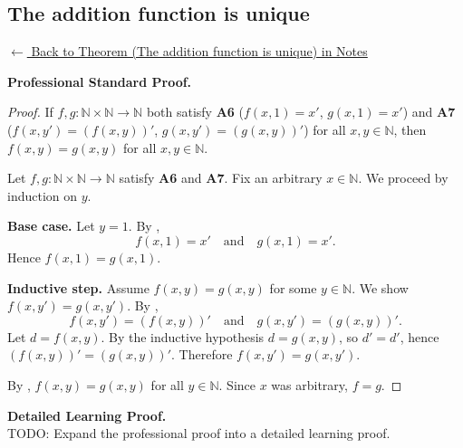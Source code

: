 
\subsection*{The addition function is unique}
\label{prf:landau-addition-unique}

\begin{remark*}[Return]
\hyperref[thm:landau-addition-unique]{$\leftarrow$ Back to Theorem
(The addition function is unique) in Notes}
\end{remark*}

\textbf{Professional Standard Proof.}~\\
\begin{proof}
\Claim If $f, g : \mathbb{N} \times \mathbb{N} \to \mathbb{N}$ both satisfy
\textbf{A6} ($f(x,1) = x'$, $g(x,1) = x'$) and \textbf{A7}
($f(x,y') = (f(x,y))'$, $g(x,y') = (g(x,y))'$) for all $x, y \in \mathbb{N}$,
then $f(x,y) = g(x,y)$ for all $x, y \in \mathbb{N}$.

Let $f, g : \mathbb{N} \times \mathbb{N} \to \mathbb{N}$ satisfy \textbf{A6}
and \textbf{A7}. Fix an arbitrary $x \in \mathbb{N}$. We proceed by induction
on $y$.

\textbf{Base case.} Let $y = 1$. By ,
\[
  f(x, 1) = x' \quad \text{and} \quad g(x, 1) = x'.
\]
Hence $f(x, 1) = g(x, 1)$.

\textbf{Inductive step.} Assume $f(x, y) = g(x, y)$ for some
$y \in \mathbb{N}$. We show $f(x, y') = g(x, y')$.
By ,
\[
  f(x, y') = (f(x, y))' \quad \text{and} \quad g(x, y') = (g(x, y))'.
\]
Let $d = f(x,y)$. By the inductive hypothesis $d = g(x,y)$, so $d' = d'$,
hence $(f(x,y))' = (g(x,y))'$. Therefore $f(x,y') = g(x,y')$.

By , $f(x,y) = g(x,y)$ for all $y \in \mathbb{N}$.
Since $x$ was arbitrary, $f = g$.
\end{proof}

\textbf{Detailed Learning Proof.}~\\
TODO: Expand the professional proof into a detailed learning proof.


